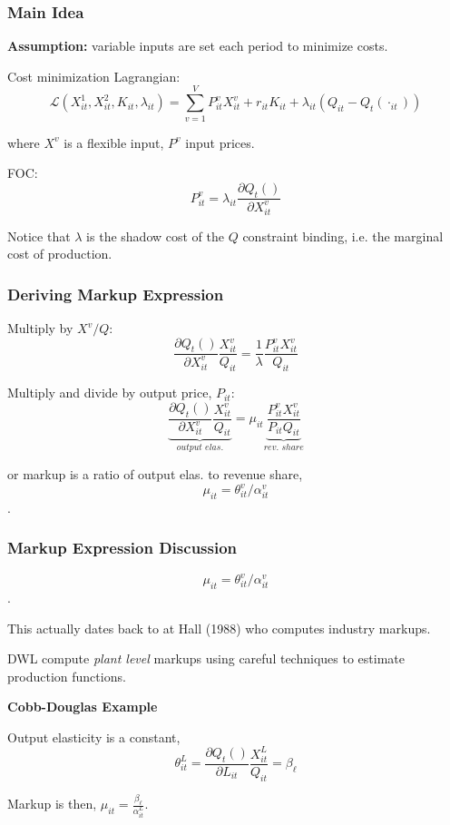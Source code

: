 \documentclass[11pt, aspectratio=169]{beamer}
\newenvironment{wideitemize}{\itemize\addtolength{\itemsep}{10pt}}{\enditemize}
\begin{document}
\begin{frame}[c]\frametitle{Main Idea}
    
\textbf{Assumption:} variable inputs are set each period to minimize costs. 

\bigskip
\begin{wideitemize}
	\item Cost minimization Lagrangian:
	$$\mathcal{L}(X^1_{it},X^2_{it},K_{it},\lambda_{it}) = \sum_{v=1}^V P^v_{it} X^v_{it} + r_{it}K_{it} + \lambda_{it}(Q_{it} - Q_{t}(\cdot_{it})) $$
	\item where $X^v$ is a flexible input, $P^v$ input prices.\pause
	\item FOC:
	$$ P^v_{it} = \lambda_{it}\frac{\partial Q_t()}{\partial X^v_{it} } $$
	\item Notice that $\lambda$ is the shadow cost of the $Q$ constraint binding, i.e. the marginal cost of production. 
\end{wideitemize}

\end{frame}


\begin{frame}[t]\frametitle{Deriving Markup Expression}
    

\begin{wideitemize}
	\item Multiply by $X^v/Q$:
	$$ \frac{\partial Q_t()}{\partial X^v_{it}} \frac{X^v_{it}}{Q_{it}} 
	= \frac{1}{\lambda} \frac{P^v_{it} X^v_{it}}{Q_{it}}$$\pause
	\item Multiply and divide by output price, $P_{it}$:
	$$ \underbrace{\frac{\partial Q_t()}{\partial X^v_{it}} \frac{X^v_{it}}{Q_{it}}}_{output\,\,elas.} 
	= \mu_{it} \underbrace{\frac{P^v_{it} X^v_{it}}{P_{it}Q_{it}}}_{rev.\,\,share}$$
	\item or markup is a ratio of output elas. to revenue share,
	$$ \mu_{it} = \theta^v_{it} / \alpha^v_{it} $$.
\end{wideitemize}

\end{frame}


\begin{frame}[c]\frametitle{Markup Expression Discussion}
    
	$$ \mu_{it} = \theta^v_{it} / \alpha^v_{it} $$.
\begin{wideitemize}
	\item This actually dates back to at Hall (1988) who computes industry markups. 
	\item DWL compute \emph{plant level} markups using careful techniques to estimate production functions. 
\end{wideitemize}

\bigskip
\textbf{Cobb-Douglas Example}
\begin{wideitemize}
	\item Output elasticity is a constant,
	$$\theta^L_{it} = \frac{\partial Q_t()}{\partial L_{it}} \frac{X^L_{it}}{Q_{it}} = \beta_{\ell}$$
	\item Markup is then, $\mu_{it} = \frac{\beta_{\ell}}{\alpha^L_{it}}$.
\end{wideitemize}

\end{frame}
\end{document}
